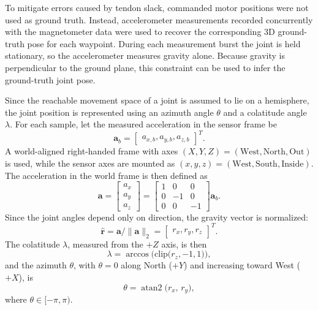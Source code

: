 To mitigate errors caused by tendon slack, commanded motor positions were not used as ground truth. Instead, accelerometer measurements recorded concurrently with the magnetometer data were used to recover the corresponding 3D ground-truth pose for each waypoint. During each measurement burst the joint is held stationary, so the accelerometer measures gravity alone. Because gravity is perpendicular to the ground plane, this constraint can be used to infer the ground-truth joint pose.

Since the reachable movement space of a joint is assumed to lie on a hemisphere, the joint position is represented using an azimuth angle \(\theta\) and a colatitude angle \(\lambda\). For each sample, let the measured acceleration in the sensor frame be
\begin{equation}
    \mathbf a_b =
        \begin{bmatrix}
        a_{x,b}, 
        a_{y,b}, 
        a_{z,b}
        \end{bmatrix}^T .
\end{equation}
A world-aligned right-handed frame with axes \((X,Y,Z)=(\text{West},\text{North},\text{Out})\) is used, while the sensor axes are mounted as \((x,y,z)=(\text{West},\text{South},\text{Inside})\). The acceleration in the world frame is then defined as
\begin{equation}
    \mathbf a=
        \begin{bmatrix}
        a_x\\
        a_y\\
        a_z
        \end{bmatrix}
        =
        \begin{bmatrix}
        1&0&0\\
        0&-1&0\\
        0&0&-1
        \end{bmatrix}
        \mathbf a_b .
\end{equation}
Since the joint angles depend only on direction, the gravity vector is normalized:
\begin{equation}
    \hat{\mathbf r}=\mathbf a/\|\mathbf a\|_2 =
        \begin{bmatrix}
        r_x, 
        r_y,
        r_z
        \end{bmatrix}^T .
\end{equation}
The colatitude \(\lambda\), measured from the \(+Z\) axis, is then
\begin{equation}
\lambda=\arccos\!\Big(\mathrm{clip}\big(r_z,-1,1\big)\Big),
\end{equation}
and the azimuth \(\theta\), with \(\theta=0\) along North (\(+Y\)) and increasing toward West (\(+X\)), is
\begin{equation}
\theta=\operatorname{atan2}\!\big(r_x,\,r_y\big),
\end{equation}
where \(\theta \in [-\pi,\pi)\).


